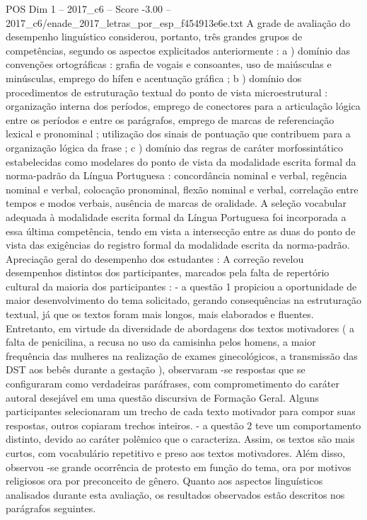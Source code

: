 \begin{textsample}{POS Dim 1 – 2017\_c6 – Score -3.00 – 2017\_c6/enade\_2017\_letras\_por\_esp\_f454913e6e.txt}
A grade de avaliação do desempenho linguístico considerou, portanto, três grandes grupos de competências, segundo os aspectos explicitados anteriormente : a ) domínio das convenções ortográficas : grafia de vogais e consoantes, uso de maiúsculas e minúsculas, emprego do hífen e acentuação gráfica ; b ) domínio dos procedimentos de estruturação textual do ponto de vista microestrutural : organização interna dos períodos, emprego de conectores para a articulação lógica entre os períodos e entre os parágrafos, emprego de marcas de referenciação lexical e pronominal ; utilização dos sinais de pontuação que contribuem para a organização lógica da frase ; c ) domínio das regras de caráter morfossintático estabelecidas como modelares do ponto de vista da modalidade escrita formal da norma-padrão da Língua Portuguesa : concordância nominal e verbal, regência nominal e verbal, colocação pronominal, flexão nominal e verbal, correlação entre tempos e modos verbais, ausência de marcas de oralidade.
A seleção vocabular adequada à modalidade escrita formal da Língua Portuguesa foi incorporada a essa última competência, tendo em vista a intersecção entre as duas do ponto de vista das exigências do registro formal da modalidade escrita da norma-padrão.
Apreciação geral do desempenho dos estudantes : A correção revelou desempenhos distintos dos participantes, marcados pela falta de repertório cultural da maioria dos participantes : - a questão 1 propiciou a oportunidade de maior desenvolvimento do tema solicitado, gerando consequências na estruturação textual, já que os textos foram mais longos, mais elaborados e fluentes.
Entretanto, em virtude da diversidade de abordagens dos textos motivadores ( a falta de penicilina, a recusa no uso da camisinha pelos homens, a maior frequência das mulheres na realização de exames ginecológicos, a transmissão das DST aos bebês durante a gestação ), observaram -se respostas que se configuraram como verdadeiras paráfrases, com comprometimento do caráter autoral desejável em uma questão discursiva de Formação Geral.
Alguns participantes selecionaram um trecho de cada texto motivador para compor suas respostas, outros copiaram trechos inteiros. - a questão 2 teve um comportamento distinto, devido ao caráter polêmico que o caracteriza.
Assim, os textos são mais curtos, com vocabulário repetitivo e preso aos textos motivadores.
Além disso, observou -se grande ocorrência de protesto em função do tema, ora por motivos religiosos ora por preconceito de gênero.
Quanto aos aspectos linguísticos analisados durante esta avaliação, os resultados observados estão descritos nos parágrafos seguintes.

\end{textsample}

